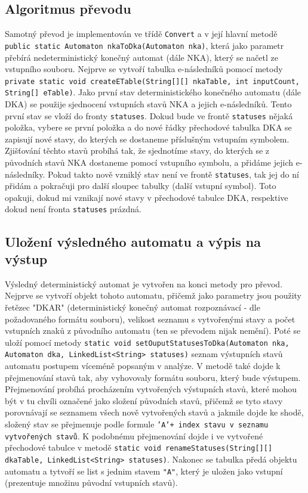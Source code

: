 \documentclass[11pt]{article}
\begin{document}
\subsection{Algoritmus převodu}
Samotný převod je implementován ve třídě \texttt{Convert} a v její hlavní metodě \texttt{public static Automaton nkaToDka(Automaton nka)}, která jako parametr přebírá nedeterministický konečný automat (dále NKA), který se načetl ze vstupního souboru. Nejprve se vytvoří tabulka e-následníků pomocí metody \texttt{private static void createETable(String[][] nkaTable, int inputCount, String[] eTable)}. Jako první stav deterministického konečného automatu (dále DKA) se použije sjednocení vstupních stavů NKA a jejich e-následníků. Tento první stav se vloží do fronty \texttt{statuses}. Dokud bude ve frontě \texttt{statuses} nějaká položka, vybere se první položka a do nové řádky přechodové tabulka DKA se zapisují nové stavy, do kterých se dostaneme příslušným vstupním symbolem. Zjišťování těchto stavů probíhá tak, že sjednotíme stavy, do kterých se z původních stavů NKA dostaneme pomocí vstupního symbolu, a přidáme jejich e-následníky. Pokud takto nově vzniklý stav není ve frontě \texttt{statuses}, tak jej do ní přidám a pokračuji pro další sloupec tabulky (další vstupní symbol). Toto opakuji, dokud mi vznikají nové stavy v přechodové tabulce DKA, respektive dokud není fronta \texttt{statuses} prázdná.

\subsection{Uložení výsledného automatu a výpis na výstup}
Výsledný deterministický automat je vytvořen na konci metody pro převod. Nejprve se vytvoří objekt tohoto automatu, přičemž jako parametry jsou použity řetězec "DKAR" (deterministický konečný automat rozpoznávací - dle požadovaného formátu souboru), velikost seznamu s vytvořenými stavy a počet vstupních znaků z původního automatu (ten se převodem nijak nemění). Poté se uloží pomocí metody \texttt{static void setOuputStatusesToDka(Automaton nka, Automaton dka, LinkedList<String> statuses)} seznam výstupních stavů automatu postupem víceméně popsaným v analýze. V metodě také dojde k přejmenování stavů tak, aby vyhovovaly formátu souboru, který bude výstupem. Přejmenování probíhá procházením vytvořených výstupních stavů, které mohou být v tu chvíli označené jako složení původních stavů, přičemž se tyto stavy porovnávají se seznamem všech nově vytvořených stavů a jakmile dojde ke shodě, složený stav se přejmenuje podle formule \texttt{'A'+ index stavu v seznamu vytvořených stavů}. K podobnému přejmenování dojde i ve vytvořené přechodové tabulce v metodě \texttt{static void renameStatuses(String[][] dkaTable, LinkedList<String> statuses)}. Nakonec se tabulka předá objektu automatu a tytvoří se list s jednim stavem \texttt{"A"}, který je uložen jako vstupní (prezentuje množinu původní vstupních stavů).
\end{document}
